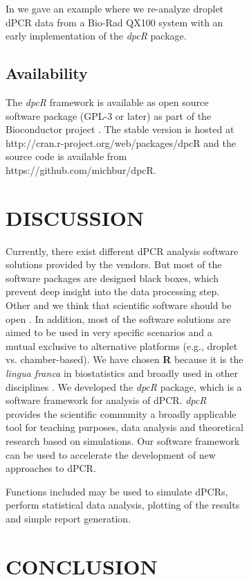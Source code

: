 \documentclass[a4,center,fleqn]{NAR}
\begin{document}
\begin{figure}[t]
\begin{figure}[t]
In \cite{rodiger_r_2015} we gave an example where we re-analyze droplet dPCR 
data from a Bio-Rad QX100 system with an early implementation of the 
\textit{dpcR} package.

\subsection{Availability}

The \textit{dpcR} framework is available as open source software package (GPL-3 
or later) as part of the Bioconductor project \cite{gentleman_2004}. The stable 
version is hosted at http://cran.r-project.org/web/packages/dpcR and the source 
code is available from  https://github.com/michbur/dpcR.

\section{DISCUSSION}

Currently, there exist different dPCR analysis software solutions provided by 
the vendors. But most of the software packages are designed black boxes, which 
prevent deep insight into the data processing step. Other and we think that 
scientific software should be open \cite{morin_shining_2012, ince_case_2012, 
rodiger_r_2015}. In addition, most of the software solutions are aimed to be 
used in very specific scenarios and a mutual exclusive to alternative platforms 
(e.g., droplet vs. chamber-based). We have chosen \textbf{R} because it is the 
\textit{lingua franca} in biostatistics and broadly used in other disciplines 
\cite{rodiger_r_2015}. We developed the \textit{dpcR} package, which is a 
software framework for analysis of dPCR. \textit{dpcR} provides the scientific 
community a broadly applicable tool for teaching purposes, data analysis and 
theoretical research based on simulations. Our software framework can be used to 
accelerate the development of new approaches to dPCR.

Functions included may be used to simulate dPCRs, perform statistical data 
analysis, plotting of the results and simple report generation. 

\section{CONCLUSION}


\end{figure}
\end{figure}
\end{document}
